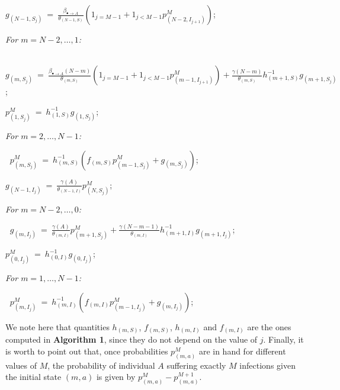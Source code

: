 \documentclass[preprint,12pt]{elsarticle}
\begin{document}
\par {}
\begin{description}
  \item $g_{(N-1,S_j)} ~=~ \frac{\beta_{\bullet\rightarrow A}}{\theta_{(N-1,S)}}\left(1_{j=M-1}+1_{j<M-1}p^M_{(N-2,I_{j+1})}\right)$;
  \item \it For $m=N-2,\dots,1$:
  \item $~$\hspace{0.5cm} $g_{(m,S_j)} ~=~ \frac{\beta_{\bullet\rightarrow A}(N-m)}{\theta_{(m,S)}}\left(1_{j=M-1}+1_{j<M-1}p^M_{(m-1,I_{j+1})}\right)+\frac{\gamma(N-m)}{\theta_{(m,S)}}h_{(m+1,S)}^{-1}g_{(m+1,S_j)}$;
  \item $p^M_{(1,S_j)} ~=~ h_{(1,S)}^{-1}g_{(1,S_j)}$;
  \item \it For $m=2,\dots,N-1$:
  \item $~$\hspace{0.5cm} $p^M_{(m,S_j)} ~=~ h_{(m,S)}^{-1}\left(f_{(m,S)}p^M_{(m-1,S_j)}+g_{(m,S_j)}\right)$;
\end{description}

\vspace{0.5cm}
\par {}
\begin{description}
  \item $g_{(N-1,I_j)} ~=~ \frac{\gamma(A)}{\theta_{(N-1,I)}}p^M_{(N,S_{j})}$;
  \item \it For $m=N-2,\dots,0$:
  \item $~$\hspace{0.5cm} $g_{(m,I_j)} ~=~ \frac{\gamma(A)}{\theta_{(m,I)}}p^M_{(m+1,S_j)}+\frac{\gamma(N-m-1)}{\theta_{(m,I)}}h_{(m+1,I)}^{-1}g_{(m+1,I_j)}$;
  \item $p^M_{(0,I_j)} ~=~ h_{(0,I)}^{-1}g_{(0,I_j)}$;
  \item \it For $m=1,\dots,N-1$:
  \item $~$\hspace{0.5cm} $p^M_{(m,I_j)} ~=~ h_{(m,I)}^{-1}\left(f_{(m,I)}p^M_{(m-1,I_j)}+g_{(m,I_j)}\right)$;
\end{description}

\par\noindent We note here that quantities $h_{(m,S)}$, $f_{(m,S)}$, $h_{(m,I)}$ and $f_{(m,I)}$ are the ones computed in {\bf Algorithm 1}, since they do not depend
on the value of $j$. Finally, it is worth to point out that, once probabilities $p^M_{(m,a)}$ are in hand for different values of $M$, the probability
of individual $A$ suffering exactly $M$ infections given the initial state $(m,a)$ is given by $p^M_{(m,a)}-p^{M+1}_{(m,a)}$.\\
\end{document}

